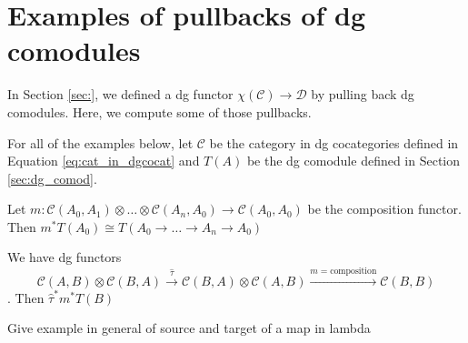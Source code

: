 \section{Examples of pullbacks of dg comodules}
In Section \ref{sec:}, we defined a dg functor
$\chi(\mathcal{C}) \to \mathcal{D}$ 
by pulling back dg comodules. Here, we compute 
some of those pullbacks.

For all of the examples below, let $\mathcal{C}$ 
be the category in dg cocategories defined in 
Equation \ref{eq:cat_in_dgcocat} and $T(A)$ be the 
dg comodule defined in Section \ref{sec:dg_comod}.

\begin{eg} Let $m:\mathcal{C}(A_0,A_1) \otimes \dots \otimes 
\mathcal{C}(A_n, A_0) \to \mathcal{C}(A_0,A_0)$ be the composition 
functor. Then $m^*T(A_0) \cong T(A_0 \to \dots \to A_n \to A_0)$
\end{eg}

\begin{eg} We have dg functors
$$\mathcal{C}(A,B) \otimes 
\mathcal{C}(B,A) 
\xrightarrow{\hat{\tau}}
\mathcal{C}(B,A) \otimes 
\mathcal{C}(A,B) 
\xrightarrow{m=\textrm{composition}}
 \mathcal{C}(B,B)$$. Then $\hat{\tau}^*m^*T(B)$
\end{eg}

Give example in general of source and target 
of a map in lambda